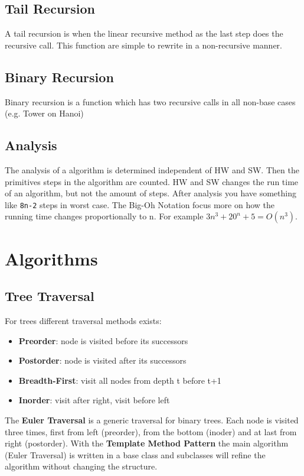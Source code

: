 \documentclass[11pt,twoside,landscape]{article}
\begin{document}
\begin{multicols}{2}
\subsection*{Tail Recursion}
\label{sec:orgff0c4e7}
A tail recursion is when the linear recursive method as the last step does the recursive call. This function are simple to rewrite in a non-recursive manner.

\subsection*{Binary Recursion}
\label{sec:orgedea31f}
Binary recursion is a function which has two recursive calls in all non-base cases (e.g. Tower on Hanoi)

\subsection*{Analysis}
\label{sec:org3d53d2b}
The analysis of a algorithm is determined independent of HW and SW. Then the primitives steps in the algorithm are counted. HW and SW changes the run time of an algorithm, but not the amount of steps. After analysis you have something like \texttt{8n-2} steps in worst case. The Big-Oh Notation focus more on how the running time changes proportionally to n. For example \(3n^3 + 20^n + 5 = O(n^3)\).
\newpage
\section*{Algorithms}
\label{sec:org6d74462}
\subsection*{Tree Traversal}
\label{sec:orgcd81762}
For trees different traversal methods exists:
\begin{itemize}
\item \textbf{Preorder}: node is visited before its successors
\item \textbf{Postorder}: node is visited after its successors
\item \textbf{Breadth-First}: visit all nodes from depth t before t+1
\item \textbf{Inorder}: visit after right, visit before left
\end{itemize}

The \textbf{Euler Traversal} is a generic traversal for binary trees. Each node is visited three times, first from left (preorder), from the bottom (inoder) and at last from right (postorder). With the \textbf{Template Method Pattern} the main algorithm (Euler Traversal) is written in a base class and subclasses will refine the algorithm without changing the structure.


\end{multicols}
\end{document}
